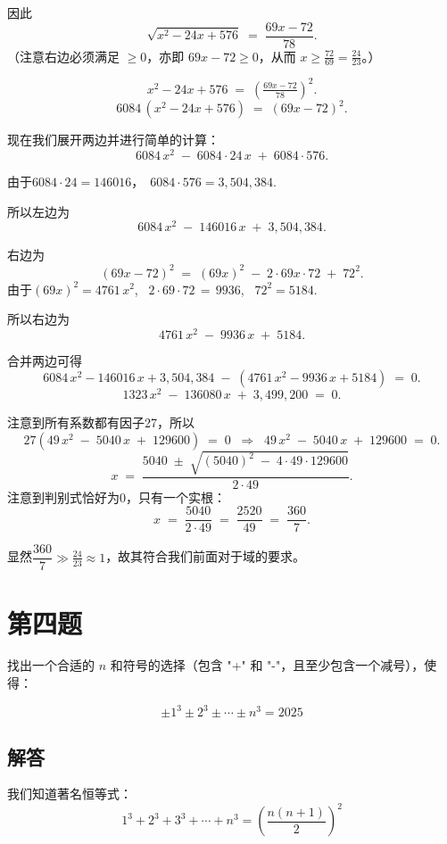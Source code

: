 \documentclass[12pt, a4paper]{article}
\theoremstyle{definition}
\theoremstyle{remark}
\begin{document}
\noindent 因此
$$
\sqrt{x^2 - 24x + 576}
\;=\;
\dfrac{69x - 72}{78}.
$$
（注意右边必须满足 \(\ge 0\)，亦即 \(69x - 72 \ge 0\)，从而 \(x \ge \tfrac{72}{69} = \tfrac{24}{23}\)。）

$$
x^2 - 24x + 576
\;=\;
\left(\tfrac{69x - 72}{78}\right)^2.
$$
$$
6084\,\left(x^2 - 24x + 576\right)
\;=\;
(69x - 72)^2.
$$

\noindent 现在我们展开两边并进行简单的计算：
$$
6084\,x^2 
\;-\;
6084 \cdot 24\,x
\;+\;
6084 \cdot 576.
$$

\noindent 由于\(6084 \cdot 24 = 146016\)，\, \(6084 \cdot 576 = 3{,}504{,}384.\)

\noindent 所以左边为
$$
6084\,x^2 
\;-\; 146016\,x 
\;+\; 3{,}504{,}384.
$$

\noindent 右边为
$$
(69x - 72)^2 
\;=\;
(69x)^2
\;-\;
2 \cdot 69x \cdot 72
\;+\;
72^2.
$$
由于\( (69x)^2 = 4761\,x^2\), \, \( 2 \cdot 69 \cdot 72 \,=\, 9936\), \, \( 72^2 = 5184.\)

\noindent 所以右边为
$$
4761\,x^2 \;-\; 9936\,x \;+\; 5184.
$$

\noindent 合并两边可得
$$
6084\,x^2 - 146016\,x + 3{,}504{,}384 
\;-\;
\left(4761\,x^2 - 9936\,x + 5184\right)
\;=\;0.
$$
$$
1323\,x^2 
\;-\;
136080\,x 
\;+\;
3{,}499{,}200
\;=\;
0.
$$

\noindent 注意到所有系数都有因子27，所以
$$
27
\left(49\,x^2 \;-\;5040\,x \;+\;129600\right)
\;=\;0
\;\;\Rightarrow\;\;
49\,x^2 \;-\;5040\,x \;+\;129600
\;=\;0.
$$
$$
x \;=\;
\dfrac{5040 \;\pm\; \sqrt{(5040)^2 \;-\;4\cdot 49 \cdot 129600}}{2\cdot 49}.
$$
注意到判别式恰好为0，只有一个实根：
$$
x 
\;=\;
\dfrac{5040}{2 \cdot 49}
\;=\;
\dfrac{2520}{49}
\;=\;
\dfrac{360}{7}.
$$

\noindent 显然\(\dfrac{360}{7} \gg \frac{24}{23} \approx 1\)，故其符合我们前面对于域的要求。

\newpage

\section{第四题}

\noindent 找出一个合适的 $n$ 和符号的选择（包含 "+" 和 "-"，且至少包含一个减号），使得：

$$
\pm 1^3 \pm 2^3 \pm \cdots \pm n^3=2025
$$


\subsection{解答}

\noindent 我们知道著名恒等式：
$$
1^3+2^3+3^3+\cdots+n^3=\left(\frac{n(n+1)}{2}\right)^2
$$
\end{document}

